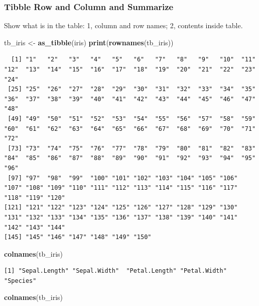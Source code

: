 \documentclass[
]{book}
\newenvironment{Shaded}{\begin{snugshade}}{\end{snugshade}}
\newcommand{\KeywordTok}[1]{\textcolor[rgb]{0.13,0.29,0.53}{\textbf{#1}}}
\newcommand{\NormalTok}[1]{#1}
\newcommand{\StringTok}[1]{\textcolor[rgb]{0.31,0.60,0.02}{#1}}
\begin{document}
\hypertarget{tibble-row-and-column-and-summarize}{%
\subsubsection{Tibble Row and Column and Summarize}\label{tibble-row-and-column-and-summarize}}

Show what is in the table: 1, column and row names; 2, contents inside table.

\begin{Shaded}
\begin{Highlighting}[]
\NormalTok{tb_iris <-}\StringTok{ }\KeywordTok{as_tibble}\NormalTok{(iris)}
\KeywordTok{print}\NormalTok{(}\KeywordTok{rownames}\NormalTok{(tb_iris))}
\end{Highlighting}
\end{Shaded}

\begin{verbatim}
  [1] "1"   "2"   "3"   "4"   "5"   "6"   "7"   "8"   "9"   "10"  "11"  "12"  "13"  "14"  "15"  "16"  "17"  "18"  "19"  "20"  "21"  "22"  "23"  "24" 
 [25] "25"  "26"  "27"  "28"  "29"  "30"  "31"  "32"  "33"  "34"  "35"  "36"  "37"  "38"  "39"  "40"  "41"  "42"  "43"  "44"  "45"  "46"  "47"  "48" 
 [49] "49"  "50"  "51"  "52"  "53"  "54"  "55"  "56"  "57"  "58"  "59"  "60"  "61"  "62"  "63"  "64"  "65"  "66"  "67"  "68"  "69"  "70"  "71"  "72" 
 [73] "73"  "74"  "75"  "76"  "77"  "78"  "79"  "80"  "81"  "82"  "83"  "84"  "85"  "86"  "87"  "88"  "89"  "90"  "91"  "92"  "93"  "94"  "95"  "96" 
 [97] "97"  "98"  "99"  "100" "101" "102" "103" "104" "105" "106" "107" "108" "109" "110" "111" "112" "113" "114" "115" "116" "117" "118" "119" "120"
[121] "121" "122" "123" "124" "125" "126" "127" "128" "129" "130" "131" "132" "133" "134" "135" "136" "137" "138" "139" "140" "141" "142" "143" "144"
[145] "145" "146" "147" "148" "149" "150"
\end{verbatim}

\begin{Shaded}
\begin{Highlighting}[]
\KeywordTok{colnames}\NormalTok{(tb_iris)}
\end{Highlighting}
\end{Shaded}

\begin{verbatim}
[1] "Sepal.Length" "Sepal.Width"  "Petal.Length" "Petal.Width"  "Species"     
\end{verbatim}

\begin{Shaded}
\begin{Highlighting}[]
\KeywordTok{colnames}\NormalTok{(tb_iris)}
\end{Highlighting}
\end{Shaded}
\end{document}
